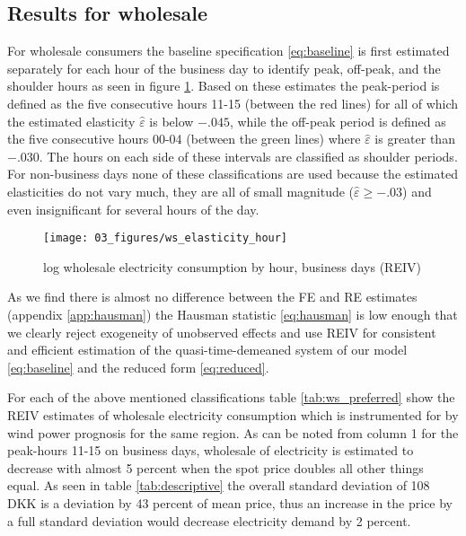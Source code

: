 \label{sec:results}
\subsection{Results for wholesale}
\label{subsec:r_wholesale}
For wholesale consumers the baseline specification \eqref{eq:baseline} is first estimated separately for each hour of the business day to identify peak, off-peak, and the shoulder hours as seen in figure \ref{fig:ws_elasticity_hour}. Based on these estimates the peak-period is defined as the five consecutive hours 11-15 (between the red lines) for all of which the estimated elasticity $\widehat{\varepsilon}$ is below $-.045$, while the off-peak period is defined as the five consecutive hours 00-04 (between the green lines) where $\widehat{\varepsilon}$ is greater than $-.030$. The hours on each side of these intervals are classified as shoulder periods. For non-business days none of these classifications are used because the estimated elasticities do not vary much, they are all of small magnitude ($\widehat{\varepsilon}\geq-.03$)  and even insignificant for several hours of the day.
\begin{figure}[H]
  \centering
  \caption{log wholesale electricity consumption by hour, business days (REIV)}
    \label{fig:ws_elasticity_hour}
  \texttt{[image: 03\_figures/ws\_elasticity\_hour]}
\end{figure}
As we find there is almost no difference between the FE and RE estimates (appendix \ref{app:hausman}) the Hausman statistic \eqref{eq:hausman} is low enough that we clearly reject exogeneity of unobserved effects and use REIV for consistent and efficient estimation of the quasi-time-demeaned system of our model \eqref{eq:baseline} and the reduced form \eqref{eq:reduced}.
\bigskip\par
For each of the above mentioned classifications table \ref{tab:ws_preferred} show the REIV estimates of wholesale electricity consumption which is instrumented for by wind power prognosis for the same region. As can be noted from column 1 for the peak-hours 11-15 on business days, wholesale of electricity is estimated to decrease with almost 5 percent when the spot price doubles all other things equal. As seen in table \ref{tab:descriptive} the overall standard deviation of 108 DKK is a deviation by 43 percent of mean price, thus an increase in the price by a full standard deviation would decrease electricity demand by 2 percent.
\par
